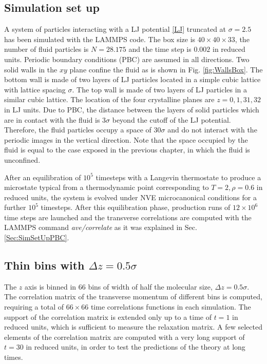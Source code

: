 \documentclass[a4paper,openright,12pt]{book}
\begin{document}
\subsection{Simulation set up}
A system of particles interacting  with a LJ potential \ref{LJ}
truncated at $\sigma=2.5$ has been simulated with the LAMMPS code. The
box size  is $40\times40\times33$,  the number  of fluid  particles is
$N=28.175$ and  the time step  is $0.002$ in reduced  units.  Periodic
boundary conditions  (PBC) are assumed  in all directions.   Two solid
walls in the $xy$ plane confine the fluid as is shown in Fig. \ref{fig:WallsBox}.  The bottom wall is made of
two layers  of LJ  particles located  in a  simple cubic  lattice with
lattice spacing  $\sigma$. The top  wall is made  of two layers  of LJ
particles  in a  similar  cubic  lattice.  The  location  of the  four
crystalline planes  are $z=0,1,31,32$  in LJ units.   Due to  PBC, the
distance between  the layers of  solid particles which are  in contact
with   the  fluid   is  $3\sigma$   beyond  the   cutoff  of   the  LJ
potential. Therefore, the fluid particles occupy a space of $30\sigma$
and  do  not  interact  with  the  periodic  images  in  the  vertical
direction. Note that the space occupied by the fluid is equal to the case exposed in the previous chapter, in which the fluid is unconfined. 

After an equilibration of $10^5$ timesteps with a Langevin thermostate
to   produce  a   microstate  typical   from  a   thermodynamic  point
corresponding  to  $T=2,\rho=0.6$ in  reduced  units,  the system  is
evolved  under  NVE microcanonical  conditions  for  a further  $10^5$
timesteps.  After this equilibration  phase, production runs of $12\times 10^6$
time steps are launched and the transverse correlations are computed with the LAMMPS command \textit{ave/correlate} as it was explained in Sec. \ref{Sec:SimSetUpPBC}. 

\subsection{Thin bins with $\Delta z = 0.5\sigma$}
\label{Sec:ThinBins}
The $z$  axis is binned  in $66$ bins of  width of half  the molecular
size, $\Delta z=0.5\sigma$.  The  correlation matrix of the transverse
momentum of different bins is computed, requiring a total of $66\times
66$ time correlations  functions  in each  simulation.   
The support of  the correlation matrix  is extended only  up to a  time of
$t=1$ in reduced units, which  is sufficient to measure the relaxation
matrix.   A  few  selected  elements of  the  correlation  matrix  are
computed with a very long support of $t=30$ in reduced units, in order
to test the predictions of the theory at long times.
\end{document}
